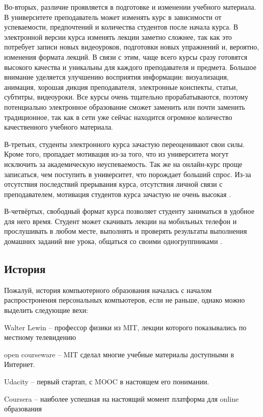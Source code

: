\documentclass{matmex-diploma-custom}
\begin{document}
Во-вторых, различие проявляется в подготовке и изменении учебного
материала. В университете преподаватель может изменять курс в
зависимости от успеваемости, предпочтений и количества студентов после
начала курса. В электронной версии курса изменять лекции заметно
сложнее, так как это потребует записи новых видеоуроков, подготовки
новых упражнений и, вероятно, изменения формата лекций. В связи с
этим, чаще всего курсы сразу готовятся высокого качества и уникальны
для каждого преподавателя и предмета. Большое внимание уделяется
улучшению восприятия информации: визуализация, анимация, хорошая
дикция преподавателя, электронные конспекты, статьи, субтитры,
видеоуроки. Все курсы очень тщательно прорабатываются, поэтому
потенциально электронное образование сможет заменить или почти
заменить традиционное, так как в сети уже сейчас находится огромное
количество качественного учебного материала.

В-третьих, студенты электронного курса зачастую переоценивают свои
силы. Кроме того, пропадает мотивация из-за того, что из университета
могут исключить за академическую неуспеваемость. Так же на онлайн-курс
проще записаться, чем поступить в университет, что порождает больший
спрос. Из-за отсутствия последствий прерывания курса, отсутствия
личной связи с преподавателем, мотивация студентов курса зачастую не
очень высокая \cite{Clow}.

В-четвёртых, свободный формат курса позволяет студенту заниматься в
удобное для него время. Студент может скачивать лекции на мобильных
телефон и прослушивать в любом месте, выполнять и проверять результаты
выполнения домашних заданий вне урока, общаться со своими
одногруппниками \cite{mak2010blogs}.

\subsection*{История}
Пожалуй, история компьютерного образования началась с началом
распростронения персональных компьютеров, если не раньше, однако можно
выделить следующие вехи:

Walter Lewin -- профессор физики из MIT, лекции которого показывались
по местному телевидению

open courseware -- MIT сделал многие учебные материалы доступными в Интернет.

Udacity -- первый стартап, с MOOC в настоящем его понимании.

Coursera -- наиболее успешная на настоящий момент платформа для online
образования
\end{document}
